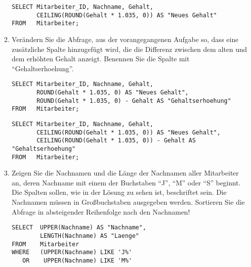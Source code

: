 \begin{enumerate}
\begin{lstlisting}[language=oracle_sql]
        \end{lstlisting}
        \begin{mssql}[\FALSE]
        \end{mssql}
        \begin{lstlisting}[language=ms_sql]
SELECT Mitarbeiter_ID, Nachname, Gehalt,
       CEILING(ROUND(Gehalt * 1.035, 0)) AS "Neues Gehalt"
FROM   Mitarbeiter;
        \end{lstlisting}
        \item Ver\"andern Sie die Abfrage, aus der vorangegangenen Aufgabe so,
        dass eine zus\"atzliche Spalte hinzugef\"ugt wird, die die Differenz
        zwischen dem alten und dem erh\"ohten Gehalt anzeigt. Benennen Sie die
        Spalte mit \enquote{Gehaltserhoehung}.
        \begin{oraclesql}[\FALSE]
        \end{oraclesql}
        \begin{lstlisting}[language=oracle_sql]
SELECT Mitarbeiter_ID, Nachname, Gehalt,
       ROUND(Gehalt * 1.035, 0) AS "Neues Gehalt",
       ROUND(Gehalt * 1.035, 0) - Gehalt AS "Gehaltserhoehung"
FROM   Mitarbeiter;
        \end{lstlisting}
\clearpage
        \begin{mssql}[\FALSE]
        \end{mssql}
        \begin{lstlisting}[language=ms_sql]
SELECT Mitarbeiter_ID, Nachname, Gehalt,
       CEILING(ROUND(Gehalt * 1.035, 0)) AS "Neues Gehalt",
       CEILING(ROUND(Gehalt * 1.035, 0)) - Gehalt AS "Gehaltserhoehung"
FROM   Mitarbeiter;
        \end{lstlisting}
        \item Zeigen Sie die Nachnamen und die L\"ange der Nachnamen aller
        Mitarbeiter an, deren Nachname mit einem der Buchstaben \enquote{J},
        \enquote{M} oder \enquote{S} beginnt. Die Spalten sollen, wie in der
        L\"osung zu sehen ist, beschriftet sein. Die Nachnamen m\"ussen in
        Gro\ss{}buchstaben ausgegeben werden. Sortieren Sie die Abfrage in
        absteigender Reihenfolge nach den Nachnamen! 
        \begin{oraclesql}[\FALSE]
        \end{oraclesql}
        \begin{lstlisting}[language=oracle_sql]
SELECT  UPPER(Nachname) AS "Nachname",
        LENGTH(Nachname) AS "Laenge"
FROM    Mitarbeiter
WHERE   (UPPER(Nachname) LIKE 'J%'
   OR    UPPER(Nachname) LIKE 'M%'

\end{lstlisting}
\end{enumerate}
